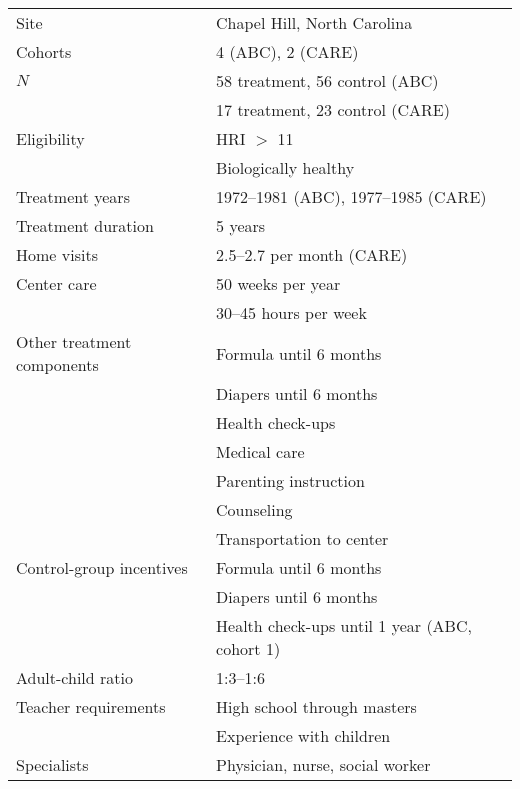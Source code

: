 \begin{tabular}{l l}
	\toprule
Site & Chapel Hill, North Carolina \\
Cohorts & 4 (ABC), 2 (CARE) \\
$N$ & 58 treatment, 56 control (ABC) \\
	& 17 treatment, 23 control (CARE) \\
\midrule
Eligibility & HRI $>$ 11 \\
		& Biologically healthy \\
\midrule
Treatment years & 1972--1981 (ABC), 1977--1985 (CARE) \\
Treatment duration & 5 years \\
\midrule
Home visits 	& 2.5--2.7	per month (CARE)	\\
Center care	& 50	weeks per year \\
		 	& 30--45 hours per week  \\
Other treatment components & Formula until 6 months\\
					& Diapers until 6 months \\ 
					& Health check-ups \\
					& Medical care \\
					& Parenting instruction \\
					& Counseling \\
					& Transportation to center \\
Control-group incentives & Formula until 6 months \\
				& Diapers until 6 months 	\\
				& Health check-ups until 1 year (ABC, cohort 1) \\
\midrule
Adult-child ratio & 1:3--1:6 \\
Teacher requirements & High school through masters \\
				& Experience with children \\
Specialists & Physician, nurse, social worker \\
\bottomrule
\end{tabular}


